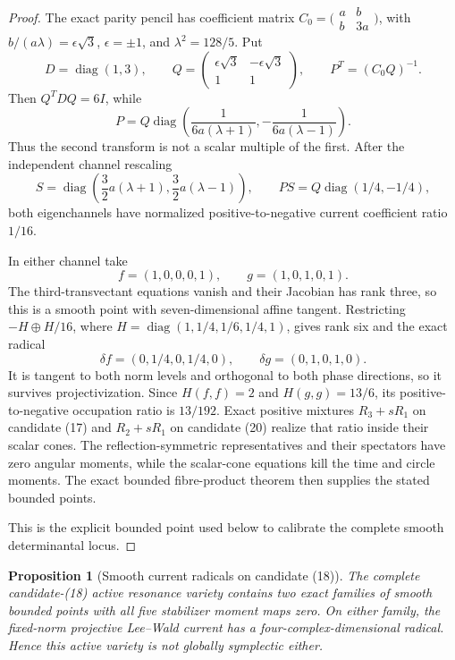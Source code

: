 \documentclass[11pt]{article}
\newtheorem{proposition}[theorem]{Proposition}
\theoremstyle{definition}
\theoremstyle{remark}
\begin{document}
\begin{proof}
The exact parity pencil has coefficient matrix
\(C_0=\bigl(\begin{smallmatrix}a&b\\b&3a\end{smallmatrix}\bigr)\), with
\(b/(a\lambda)=\epsilon\sqrt3\), \(\epsilon=\pm1\), and
\(\lambda^2=128/5\).  Put
\[
 D=\operatorname{diag}(1,3),\qquad
 Q=\begin{pmatrix}\epsilon\sqrt3&-\epsilon\sqrt3\\1&1\end{pmatrix},
 \qquad P^{T}=(C_0Q)^{-1}.
\]
Then \(Q^TDQ=6I\), while
\[
 P=Q\operatorname{diag}\!\left(
 \frac1{6a(\lambda+1)},-\frac1{6a(\lambda-1)}\right).
\]
Thus the second transform is not a scalar multiple of the first.  After the
independent channel rescaling
\[
 S=\operatorname{diag}\!\left(
 \frac32a(\lambda+1),\frac32a(\lambda-1)\right),
 \qquad PS=Q\operatorname{diag}(1/4,-1/4),
\]
both eigenchannels have normalized positive-to-negative current coefficient
ratio \(1/16\).

In either channel take
\[
 f=(1,0,0,0,1),\qquad g=(1,0,1,0,1).
\]
The third-transvectant equations vanish and their Jacobian has rank three,
so this is a smooth point with seven-dimensional affine tangent.  Restricting
\(-H\oplus H/16\), where
\(H=\operatorname{diag}(1,1/4,1/6,1/4,1)\), gives rank six and the exact
radical
\[
 \delta f=(0,1/4,0,1/4,0),\qquad
 \delta g=(0,1,0,1,0).
\]
It is tangent to both norm levels and orthogonal to both phase directions,
so it survives projectivization.  Since
\(H(f,f)=2\) and \(H(g,g)=13/6\), its positive-to-negative occupation ratio
is \(13/192\).  Exact positive mixtures \(R_3+sR_1\) on candidate (17) and
\(R_2+sR_1\) on candidate (20) realize that ratio inside their scalar cones.
The reflection-symmetric representatives and their spectators have zero
angular moments, while the scalar-cone equations kill the time and circle
moments.  The exact bounded fibre-product theorem then supplies the stated
bounded points.

This is the explicit bounded point used below to calibrate the complete
smooth determinantal locus.
\end{proof}

\begin{proposition}[Smooth current radicals on candidate (18)]
\label{prop:candidate-18-smooth-current-radical}
The complete candidate-(18) active resonance variety contains two exact
families of smooth bounded points with all five stabilizer moment maps zero.
On either family, the fixed-norm projective Lee--Wald current has a
four-complex-dimensional radical.  Hence this active variety is not globally
symplectic either.
\end{proposition}
\end{document}
